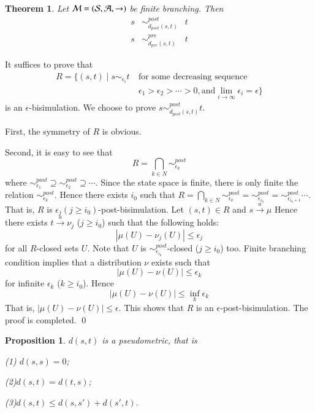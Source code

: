 \documentclass[contract,10pt]{elsarticle}
\newtheorem{theo}{Theorem}
\newtheorem{prop}{Proposition}
\newenvironment{theorem}{\begin{theo} \rm }{\end{theo}}
\newenvironment{proposition}{\begin{prop} \rm }{\end{prop}}
\newenvironment{proof}{{\noindent \bfseries Proof.}}{\qed}
\begin{document}
\begin{theorem} \label {min}Let $\cal {M}=(S,A,\rightarrow)$ be finite branching. Then
$$
\begin{array}{lll}
s&\sim^{post}_{d_{post}(s,t)}& t\\

s&\sim^{pre}_{d_{pre}(s,t)}& t
\end{array}
$$
 \end{theorem}
\begin{proof}
It suffices to prove that
$$
 \begin{aligned}
 R=\{(s,t)\mid s\sim_{\epsilon_{i}} t~&\mbox{for some decreasing sequence}\\
 & \epsilon_1> \epsilon_2>\cdots>0, \mbox{and} \lim_{i\rightarrow \infty}\epsilon_i=\epsilon\}
\end{aligned}
$$
is an $\epsilon$-bisimulation. We choose to prove $s\sim^{post}_{d_{post}(s,t)} t$.

First, the symmetry of $R$ is obvious.


Second, it is easy to see that
$$
R=\bigcap_{k\in N}\sim^{post}_{\epsilon_{k}}
$$
where $\sim^{post}_{\epsilon_{1}}\supseteq \sim^{post}_{\epsilon_{2}}\supseteq \cdots$. Since the state space is finite, there is only finite the relation  $\sim^{post}_{\epsilon_{k}}$. Hence there exists $i_0$ such that
$R=\bigcap_{k\in N}\sim^{post}_{\epsilon_{k}}=\sim^{post}_{\epsilon_{i_0}}=\sim^{post}_{\epsilon_{i_0+1}}\cdots$. That is, $R$ is $\epsilon_{j}(j\geq i_0)$-post-bisimulation. Let $(s,t)\in R$ and $s\xrightarrow{a}\mu$  Hence there exists $t\xrightarrow a\nu_{j}$ ($j\geq i_0$) such that the following holds:
$$
|\mu(U)-\nu_{j}(U)|\leq \epsilon_j
$$
for all $R$-closed sets $U$. Note that $U$ is $\sim^{post}_{\epsilon_{i_0}}$-closed ($j\geq i_0$) too. Finite branching condition implies that a distribution $\nu$ exists such that 
$$
|\mu(U)-\nu(U)|\leq \epsilon_k
$$
for infinite $\epsilon_k$ ($k\geq i_0$). Hence
$$
|\mu(U)-\nu(U)|\leq \inf_{k}\epsilon_k
$$
That is, $|\mu(U)-\nu(U)|\leq  \epsilon$. This shows that $R$ is an $\epsilon$-post-bisimulation. The proof is completed. 
\end{proof}



\begin{proposition} $d(s,t)$ is a pseudometric, that is

(1) $d(s,s)=0$;

(2)$d(s,t)=d(t,s)$;

(3)$d(s,t)\leq d(s,s')+d(s',t)$.

\end{proposition}
\end{document}
